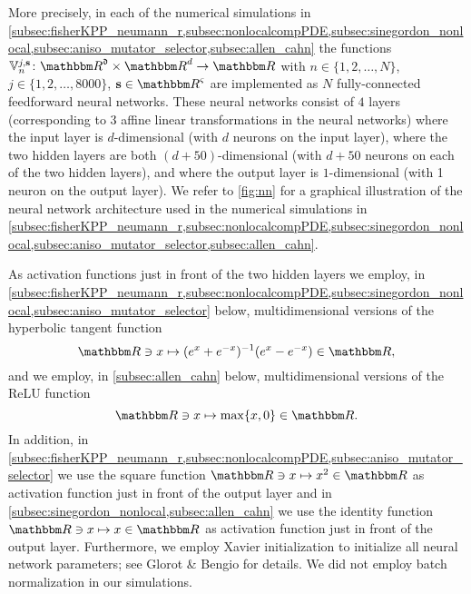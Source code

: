 More precisely, in each of the numerical simulations in \cref{subsec:fisherKPP_neumann_r,subsec:nonlocalcompPDE,subsec:sinegordon_nonlocal,subsec:aniso_mutator_selector,subsec:allen_cahn}
the functions 
$\bV^{j,\mathbf s}_n\colon \R^{\mathfrak d}\times\R^d\to\R$
with $ n \in \{ 1, 2, \dots, N\} $,
$ j \in \{ 1, 2, \dots, 8000 \} $,
$ \mathbf{s} \in \R^{\varsigma}$
are implemented as $N$
fully-connected feedforward neural networks.
%
These neural networks consist of
$ 4 $ layers (corresponding to 3 affine linear transformations in the neural networks) where
the input layer is $d$-dimensional (with $ d $ neurons on the input layer), where
the two hidden layers are both $(d+50)$-dimensional (with $d+50$ neurons on each of the two hidden layers), and where the output layer is $1$-dimensional (with 1 neuron on the output layer).
We refer to \cref{fig:nn} for a graphical illustration of the neural network architecture used in the numerical simulations in \cref{subsec:fisherKPP_neumann_r,subsec:nonlocalcompPDE,subsec:sinegordon_nonlocal,subsec:aniso_mutator_selector,subsec:allen_cahn}.

As activation functions just in front of the two hidden layers we employ, in \cref{subsec:fisherKPP_neumann_r,subsec:nonlocalcompPDE,subsec:sinegordon_nonlocal,subsec:aniso_mutator_selector} below, multidimensional versions of the hyperbolic tangent function
\begin{equation}
	\R \ni x \mapsto (e^x + e^{-x})^{-1} (e^{x} - e^{-x}) \in \R,
\end{equation}
and we employ, in \cref{subsec:allen_cahn} below, multidimensional versions of the ReLU function
\begin{equation}
	\R\ni x\mapsto \max\{x,0\}\in\R.
\end{equation}
In addition, in \cref{subsec:fisherKPP_neumann_r,subsec:nonlocalcompPDE,subsec:aniso_mutator_selector} we use the square function 
$
\R \ni x \mapsto x^2 \in \R
$
as activation function just in front of the output layer and in \cref{subsec:sinegordon_nonlocal,subsec:allen_cahn} we use the identity function 
$
\R \ni x \mapsto x \in \R
$
as activation function just in front of the output layer.
Furthermore, we employ Xavier initialization to initialize all neural network parameters; see Glorot \& Bengio \cite{glorot2010} for details. We did not employ batch normalization in our simulations.
%
%

